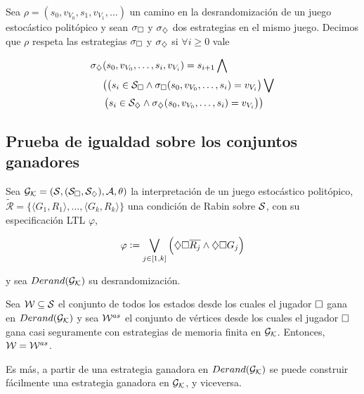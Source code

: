 Sea $\rho = (s_0, v_{V_0}, s_1, v_{V_1}, \dots)$ un camino en la
desrandomización de un juego estocástico politópico y sean $\sigma_\square$ y
$\sigma_\diamondsuit$ dos estrategias en el mismo juego. Decimos que $\rho$ respeta
las estrategias $\sigma_\square$ y $\sigma_\diamondsuit$ si $\forall i \geq 0$ vale

\begin{align*}
	\sigma_\diamondsuit&(s_0, v_{V_0}, \dots, s_i, v_{V_i})=s_{i+1} \bigwedge \\
	&\bigl( \left( s_i \in \mathcal{S}_\square \wedge \sigma_\square(s_0, v_{V_0}, \dots, s_i)=v_{V_i} \right) \bigvee \\
	&\left( s_i \in \mathcal{S}_\diamondsuit \wedge \sigma_\diamondsuit(s_0, v_{V_0}, \dots, s_i)=v_{V_i} \right) \bigr)
\end{align*}

\subsection{Prueba de igualdad sobre los conjuntos ganadores}

\begin{theorem}
	\label{teocuali}
	Sea $\mathcal{G}_{\mathcal{K}} = (\mathcal{S}, (\mathcal{S}_\square, \mathcal{S}_\diamondsuit), \mathcal{A}, \theta)$ la interpretación de un juego estocástico politópico, $\widetilde{\mathcal{R}} = \{ \langle G_1, R_1 \rangle, ..., \langle G_k, R_k \rangle \}$ una condición de Rabin sobre $\mathcal{S}$, con su especificación LTL $\varphi$,

	$$
		\varphi := \bigvee_{j \in [1, k]} \left( \diamondsuit \square \overline{R_j} \wedge \diamondsuit \square G_j \right)
	$$

	y sea $Derand(\mathcal{G}_{\mathcal{K}})$ su desrandomización.

	Sea $\mathcal{W} \subseteq \mathcal{S}$ el conjunto de todos los estados desde los cuales el
	jugador $\square$ gana en $Derand(\mathcal{G}_{\mathcal{K}})$ y sea $\mathcal{W}^{as}$ el conjunto de vértices desde
	los cuales el jugador $\square$ gana casi seguramente con estrategias de memoria
	finita en $\mathcal{G}_{\mathcal{K}}$. Entonces, $\mathcal{W} = \mathcal{W}^{as}$.

	Es más, a partir de una estrategia ganadora en $Derand(\mathcal{G}_{\mathcal{K}})$ se puede construir
	fácilmente una estrategia ganadora en $\mathcal{G}_{\mathcal{K}}$, y viceversa.
\end{theorem}

